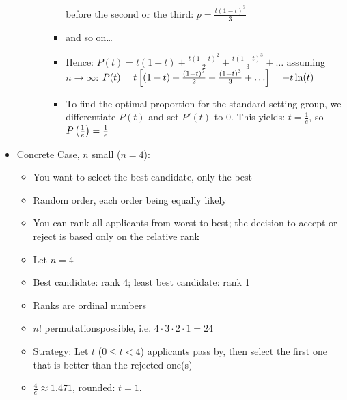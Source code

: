 \begin{example}
\begin{itemize}
\begin{itemize}
\begin{itemize}
\begin{itemize}
                                    before the second or the third: $p = \frac{t (1-t)^3}{3}$
                                \item and so on\dots
                                \item Hence: $P(t) = t (1-t) + \frac{t(1-t)^2}{2} + \frac{t (1-t)^3}{3} + \dots$ assuming $n \rightarrow \infty$:
                                    $P(t) = t \eckigeklammer{(1-t) + \frac{(1-t)^2}{2} + \frac{(1-t)^3}{3} + \dots}
                                            = - t \ln(t)$
                                \item To find the optimal proportion for the standard-setting
                                    group, we differentiate $P(t)$ and set $P'(t)$ to $0$. This
                                    yields: $t = \frac{1}{e}$, so $P\left( \frac{1}{e} \right) = \frac{1}{e}$
                            \end{itemize}
                    \end{itemize}
            \end{itemize}
        \item Concrete Case, $n$ small ($n=4$):
            \begin{itemize}
                \item You want to select the best candidate, only the best
                \item Random order, each order being equally likely
                \item You can rank all applicants from worst to best; the
                    decision to accept or reject is based only on the relative
                    rank
                \item Let $n=4$
                \item Best candidate: rank 4; least best candidate: rank 1
                \item Ranks are ordinal numbers
                \item $n!$ permutationspossible, i.e. $4 \cdot 3 \cdot 2 \cdot 1=24$
                \item Strategy: Let $t$ ($0 \leq t < 4$) applicants pass by, then
                    select the first one that is better than the rejected one(s)
                \item $\frac{4}{e} \approx 1.471$, rounded: $t=1$.
            \end{itemize}
    \end{itemize}
\end{example}

